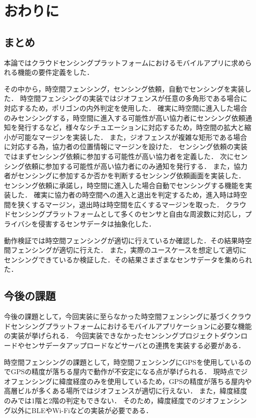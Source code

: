 \chapter{おわりに}
\thispagestyle{myheadings}

\section{まとめ}
本論ではクラウドセンシングプラットフォームにおけるモバイルアプリに求められる機能の要件定義をした．

その中から，時空間フェンシング，センシング依頼，自動でセンシングを実装した．
時空間フェンシングの実装ではジオフェンスが任意の多角形である場合に対応するため，ポリゴンの内外判定を使用した．
確実に時空間に進入した場合のみセンシングする，時空間に進入する可能性が高い協力者にセンシング依頼通知を発行するなど，様々なシチュエーションに対応するため，時空間の拡大と縮小が可能なマージンを実装した．
また，ジオフェンスが複雑な矩形である場合に対応する為，協力者の位置情報にマージンを設けた．
センシング依頼の実装ではまずセンシング依頼に参加する可能性が高い協力者を定義した．
次にセンシング依頼に参加する可能性が高い協力者にのみ通知を発行する．
また，協力者がセンシングに参加するか否かを判断するセンシング依頼画面を実装した．
センシング依頼に承諾し，時空間に進入した場合自動でセンシングする機能を実装した．
確実に協力者の時空間への進入と退出を判定するため，進入時は時空間を狭くするマージン，退出時は時空間を広くするマージンを取った．
クラウドセンシングプラットフォームとして多くのセンサと自由な周波数に対応し，プライバシを侵害するセンサデータは抽象化した．

動作検証では時空間フェンシングが適切に行えているか確認した．その結果時空間フェンシングが適切に行えた．
また，実際のユースケースを想定して適切にセンシングできているか検証した．その結果さまざまなセンサデータを集められた．

\section{今後の課題}
今後の課題として，今回実装に至らなかった時空間フェンシングに基づくクラウドセンシングプラットフォームにおけるモバイルアプリケーションに必要な機能の実装が挙げられる．
今回実装できなかったセンシングプロジェクトダウンロードやセンサデータアップロードなどサーバとの連携を実装する必要がある．

時空間フェンシングの課題として，時空間フェンシングにGPSを使用しているのでGPSの精度が落ちる屋内で動作が不安定になる点が挙げられる．
現時点でジオフェンシングに緯度経度のみを使用しているため，GPSの精度が落ちる屋内や高層ビルが多くある場所ではジオフェンスが適切に行えない．
また，緯度経度のみでは1階と2階の判定もできない．
そのため，緯度経度でのジオフェンシング以外にBLEやWi-Fiなどの実装が必要である．

